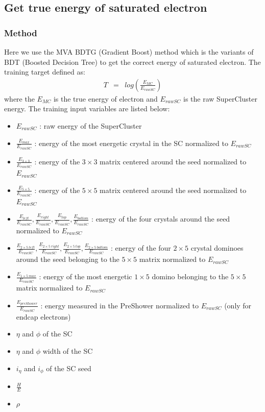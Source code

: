 \subsection{Get true energy of saturated electron}
\label{get_true_energy}
\subsubsection{Method}
Here we use the MVA BDTG (Gradient Boost) method which is the variants of BDT (Boosted
Decision Tree) to get the correct energy of saturated electron. The training target defined as:
\begin{eqnarray}
  T & = & log(\frac{E_{MC}}{E_{rawSC}}) \label{equ:target}
\end{eqnarray}
where the $E_{MC}$ is the true energy of electron and $E_{rawSC}$ is the raw
SuperCluster energy.
The training input variables are listed below:
\begin{itemize}
\item $E_{rawSC}$ : raw energy of the SuperCluster
\item $\frac{E_{max}}{E_{rawSC}}$ : energy of the most energetic crystal in the SC normalized to $E_{rawSC}$
\item $\frac{E_{3\times3}}{E_{rawSC}}$ : energy of the $3\times3$ matrix centered around the seed normalized to $E_{rawSC}$
\item $\frac{E_{5\times5}}{E_{rawSC}}$ : energy of the $5\times5$ matrix centered around the seed normalized to $E_{rawSC}$
\item $\frac{E_{left}}{E_{rawSC}}, \frac{E_{right}}{E_{rawSC}}, \frac{E_{top}}{E_{rawSC}}, \frac{E_{bottom}}{E_{rawSC}}$ : energy of the four crystals around the seed normalized to $E_{rawSC}$
\item $\frac{E_{2\times5~ left}}{E_{rawSC}}, \frac{E_{2\times5~ right}}{E_{rawSC}}, \frac{E_{2\times5~top}}{E_{rawSC}}, \frac{E_{2\times5~ bottom}}{E_{rawSC}}$ : energy of the four $2\times5$ crystal dominoes around the seed belonging to the $5\times5$ matrix normalized to $E_{rawSC}$
\item $\frac{E_{1\times5~ max}}{E_{rawSC}}$ : energy of the most energetic $1\times5$ domino belonging to the $5\times5$ matrix normalized to $E_{rawSC}$
\item $\frac{E_{preShower}}{E_{rawSC}}$ : energy measured in the PreShower normalized to $E_{rawSC}$ (only for endcap electrons)
\item $\eta$ and $\phi$ of the SC
\item $\eta$ and $\phi$ width of the SC
\item $i_{\eta}$ and $i_{\phi}$ of the SC seed
\item $\frac{H}{E}$
\item $\rho$
\end{itemize}

